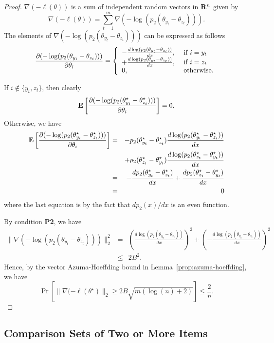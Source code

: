 \begin{proof}
$\nabla(-\ell(\theta))$ is a sum of independent random vectors in $\mathbf{R}^n$ given by
$$
\nabla(-\ell(\theta)) = \sum_{t=1}^m \nabla(-\log(p_2(\theta_{y_t}-\theta_{z_t}))).
$$
The elements of $\nabla(-\log(p_2(\theta_{y_t}-\theta_{z_t})))$ can be expressed as follows
$$
\frac{\partial (-\log(p_2(\theta_{y_t}-\theta_{z_t})))}{\partial \theta_i} = \left\{
\begin{array}{ll}
-\frac{d\log(p_2(\theta_{y_t}- \theta_{z_t}))}{dx}, & \hbox{ if } i = y_t\\
+\frac{d\log(p_2(\theta_{y_t}- \theta_{z_t}))}{dx}, & \hbox{ if } i = z_t\\
0, & \hbox{ otherwise}.
\end{array}
\right .
$$

If $i\notin \{y_t,z_t\}$, then clearly 
$$
\mathbf{E}\left[\frac{\partial (-\log(p_2(\theta_{y_t}^\star-\theta_{z_t}^\star)))}{\partial \theta_i}\right] = 0.
$$
Otherwise, we have
\begin{eqnarray*}
\mathbf{E}\left[\frac{\partial (-\log(p_2(\theta_{y_t}^\star-\theta_{z_t}^\star)))}{\partial \theta_i}\right] & = & -p_2(\theta_{y_t}^\star-\theta_{z_t}^\star)\frac{d\log(p_2(\theta_{y_t}^\star - \theta_{z_t}^\star))}{dx}\\
&& + p_2(\theta_{z_t}^\star-\theta_{y_t}^\star)\frac{d\log(p_2(\theta_{z_t}^\star - \theta_{y_t}^\star))}{dx}\\
&=& - \frac{dp_2(\theta_{y_t}^\star-\theta_{z_t}^\star)}{dx} + \frac{dp_2(\theta_{z_t}^\star-\theta_{y_t}^\star)}{dx}\\
&=& 0
\end{eqnarray*}
where the last equation is by the fact that $d p_2(x)/dx$ is an even function.

By condition {\bf P2}, we have
\begin{eqnarray*}
\|\nabla(-\log(p_2(\theta_{y_t}-\theta_{z_t})))\|_2^2  &=& \left(\frac{d\log(p_2(\theta_{y_t}-\theta_{z_t}))}{dx}\right)^2 + \left(-\frac{d\log(p_2(\theta_{y_t}-\theta_{z_t}))}{dx}\right)^2\\
& \leq & 2B^2.
\end{eqnarray*}
Hence, by the vector Azuma-Hoeffding bound in Lemma~\ref{prop:azuma-hoeffding}, we have
$$
\Pr[\|\nabla(-\ell(\theta^\star)\|_2 \geq 2B\sqrt{m(\log(n)+2)}] \leq \frac{2}{n}.
$$
\end{proof}

\subsection{Comparison Sets of Two or More Items}
\label{sec:kary}

